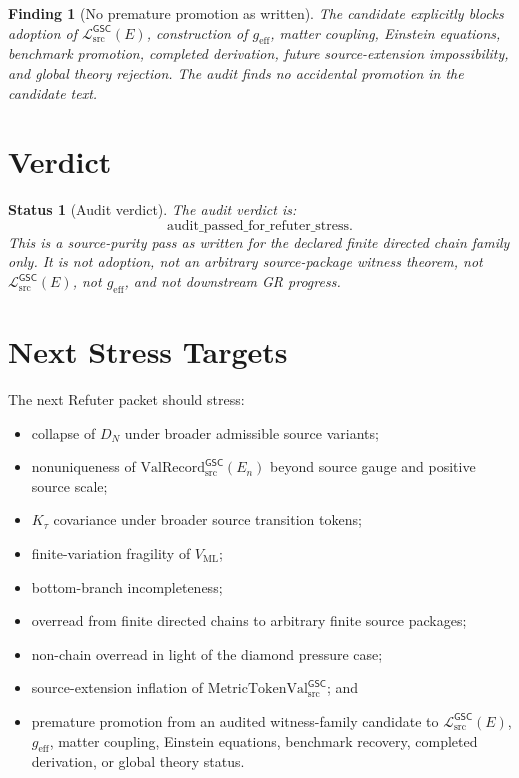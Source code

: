 \documentclass[11pt]{article}
\newcommand{\MetricTokenVal}{\mathrm{MetricTokenVal}_{\mathrm{src}}^{\mathsf{GSC}}}
\newcommand{\MetricData}{\mathcal{L}_{\mathrm{src}}^{\mathsf{GSC}}}
\newcommand{\ValRecord}{\mathrm{ValRecord}_{\mathrm{src}}^{\mathsf{GSC}}}
\newcommand{\geff}{g_{\mathrm{eff}}}
\newcommand{\En}{E_n}
\newtheorem{finding}{Finding}
\newtheorem{status}{Status}
\begin{document}
\begin{finding}[No premature promotion as written]
The candidate explicitly blocks adoption of \(\MetricData(E)\),
construction of \(\geff\), matter coupling, Einstein equations, benchmark
promotion, completed derivation, future source-extension impossibility, and
global theory rejection. The audit finds no accidental promotion in the
candidate text.
\end{finding}

\section{Verdict}

\begin{status}[Audit verdict]
The audit verdict is:
\[
  \mathrm{audit\_passed\_for\_refuter\_stress}.
\]
This is a source-purity pass as written for the declared finite directed
chain family only. It is not adoption, not an arbitrary source-package
witness theorem, not \(\MetricData(E)\), not \(\geff\), and not downstream
GR progress.
\end{status}

\section{Next Stress Targets}

The next Refuter packet should stress:
\begin{itemize}[leftmargin=*]
  \item collapse of \(D_N\) under broader admissible source variants;
  \item nonuniqueness of \(\ValRecord(\En)\) beyond source gauge and positive
  source scale;
  \item \(K_{\tau}\) covariance under broader source transition tokens;
  \item finite-variation fragility of \(V_{\mathrm{ML}}\);
  \item bottom-branch incompleteness;
  \item overread from finite directed chains to arbitrary finite source
  packages;
  \item non-chain overread in light of the diamond pressure case;
  \item source-extension inflation of \(\MetricTokenVal\); and
  \item premature promotion from an audited witness-family candidate to
  \(\MetricData(E)\), \(\geff\), matter coupling, Einstein equations,
  benchmark recovery, completed derivation, or global theory status.
\end{itemize}
\end{document}
